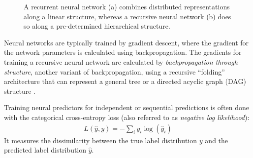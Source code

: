 \documentclass[12pt,a4paper,table]{report}
\renewcommand\cite{\citep}      %
\begin{document}
\begin{figure}[ht!]\small
  \begin{subfigure}{\textwidth}
  \parbox{.2\textwidth}{\caption{}\label{fig:rnn}}
  \parbox{.8\textwidth}{
  \centering
  }
  \end{subfigure}
  \begin{subfigure}{\textwidth}
  \parbox{.2\textwidth}{\caption{}\label{fig:recnn}}
  \parbox{.8\textwidth}{
  \centering
  }
  \end{subfigure}
  \caption{\label{fig:nns}
    A recurrent neural network (a) combines distributed representations along a
    linear structure, whereas a recursive neural network (b) does so along a
    pre-determined hierarchical structure.
  }
\end{figure}
Neural networks are typically trained by gradient descent, where the gradient for the network parameters
is calculated using backpropagation.
The gradients for training a recursive neural network are calculated by \textit{backpropagation
through structure}, another variant of backpropagation, using a recursive
``folding'' architecture that can represent a general tree or a directed acyclic
graph (DAG) structure \cite{goller1996learning}.

Training neural predictors for independent or sequential predictions is often done
with the categorical cross-entropy loss (also referred to as \emph{negative log
likelihood}):
\begin{align*}
    L(\hat{y},y) = -\sum_i y_i\log(\hat{y}_i)
\end{align*}
It measures the dissimilarity between the true label distribution
$y$ and the predicted label distribution $\hat{y}$.
\end{document}
